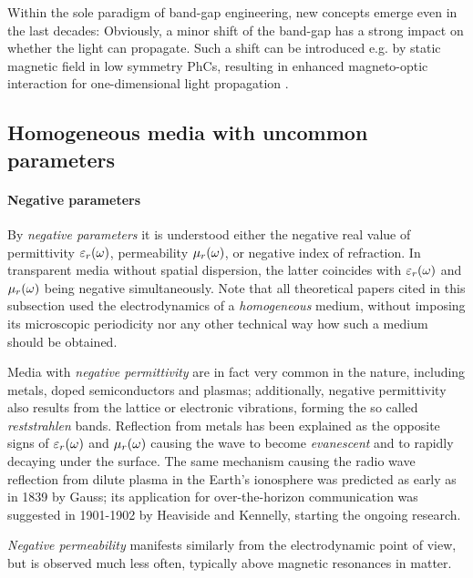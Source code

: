 Within the sole paradigm of band-gap engineering, new concepts emerge even in the last decades: Obviously, a minor shift of the band-gap has a strong impact on whether the light can propagate. Such a shift can be introduced e.g. by static magnetic field in low symmetry PhCs, resulting in enhanced magneto-optic interaction for one-dimensional light propagation \cite{vanwolleghem2009unidirectional}.


\subsection{Homogeneous media with uncommon parameters} 
\paragraph{Negative parameters}%
By \textit{negative parameters} it is understood either the negative real value of permittivity $\varepsilon_r(\omega)$, permeability $\mu_r(\omega)$, 
or negative index of refraction. In transparent media without spatial dispersion, the latter coincides with $\varepsilon_r(\omega)$ and $\mu_r(\omega)$  being negative simultaneously.  %
Note that all theoretical papers cited in this subsection used the electrodynamics of a \textit{homogeneous} medium, without imposing its microscopic periodicity nor any other technical way how such a medium should be obtained. 

Media with \textit{negative permittivity} are in fact very common in the nature, including metals, doped semiconductors and plasmas; additionally, negative permittivity also results from the lattice or electronic vibrations, forming the so called \textit{reststrahlen} bands. Reflection from metals has been explained  %
as the opposite signs of $\varepsilon_r(\omega)$ and $\mu_r(\omega)$ causing the wave to become \textit{evanescent} and to rapidly decaying under the surface. %
The same mechanism causing the radio wave reflection from dilute plasma in the Earth's ionosphere was predicted as early as in 1839 by Gauss; its application for over-the-horizon communication was suggested in 1901-1902 by Heaviside and Kennelly, starting the ongoing research.

\textit{Negative permeability} manifests similarly from the electrodynamic point of view, but is observed much less often, typically above magnetic resonances in matter.

